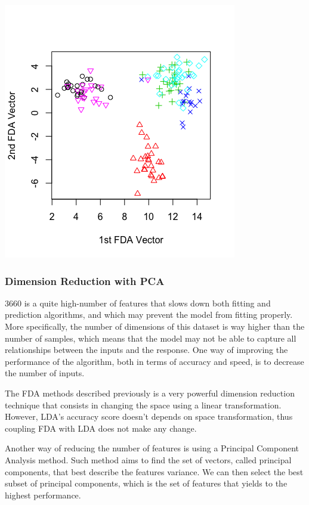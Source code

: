 \documentclass[]{report}
\begin{document}
\begin{center}
	\includegraphics[width=0.6\linewidth]{Figures/plot_fda_1_2.png}
	\label{fig:plot_fda_1_2}
\end{center}

\subsubsection{Dimension Reduction with PCA}
3660 is a quite high-number of features that slows down both fitting and prediction algorithms, and which may prevent the model from fitting properly. More specifically, the number of dimensions of this dataset is way higher than the number of samples, which means that the model may not be able to capture all relationships between the inputs and the response. One way of improving the performance of the algorithm, both in terms of accuracy and speed, is to decrease the number of inputs.

The FDA methods described previously is a very powerful dimension reduction technique that consists in changing the space using a linear transformation. However, LDA's accuracy score doesn't depends on space transformation, thus coupling FDA with LDA does not make any change.

Another way of reducing the number of features is using a Principal Component Analysis method. Such method aims to find the set of vectors, called principal components, that best describe the features variance. We can then select the best subset of principal components, which is the set of features that yields to the highest performance.
\end{document}
